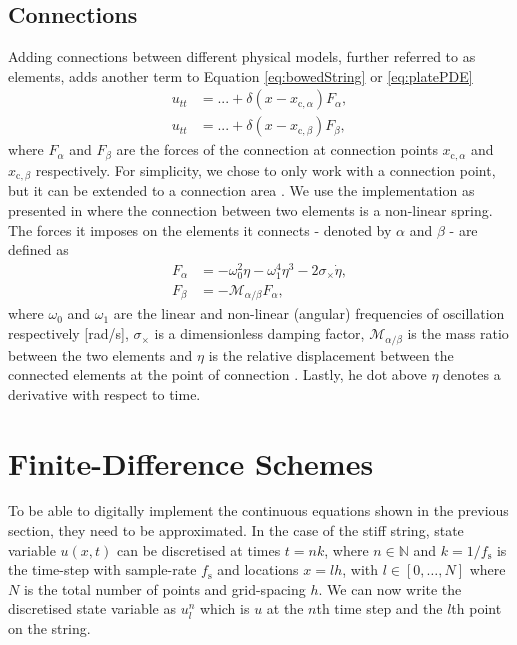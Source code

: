 \documentclass{article}
\begin{document}
\subsection{Connections}\label{sec:connections}
Adding connections between different physical models, further referred to as elements, adds another term to Equation \eqref{eq:bowedString} or \eqref{eq:platePDE}
\begin{equation}
\begin{aligned}
    u_{tt} &= ... + \delta(x-x_{\text{c},\alpha})F_\alpha, \\
    u_{tt} &= ... + \delta(x-x_{\text{c},\beta})F_\beta,
\end{aligned}
\end{equation}
where $F_\alpha$ and $F_\beta$ are the forces of the connection at connection points $x_{\text{c},\alpha}$ and $x_{\text{c},\beta}$ respectively. For simplicity, we chose to only work with a connection point, but it can be extended to a connection area \cite{Bilbao2009:ModularPercussion}. We use the implementation as presented in \cite{Bilbao2009:ModularPercussion} where the connection between two elements is a non-linear spring. The forces it imposes on the elements it connects - denoted by $\alpha$ and $\beta$ - are defined as
\begin{subequations}\label{eq:connectionsPDE}
\begin{align}
    F_\alpha &= -\omega_0^2\eta - \omega_1^4\eta^3 - 2\sigma_\times\dot\eta,\\
    F_\beta &= -\mathcal{M}_{\alpha/\beta}F_\alpha,
\end{align}
\end{subequations}
where $\omega_0$ and $\omega_1$ are the linear and non-linear (angular) frequencies of oscillation respectively [rad/s], $\sigma_\times$ is a dimensionless damping factor, $\mathcal{M}_{\alpha/\beta}$ is the mass ratio between the two elements and $\eta$ is the relative displacement between the connected elements at the point of connection%
. Lastly, he dot above $\eta$ denotes a derivative with respect to time.

\section{Finite-Difference Schemes}\label{sec:FDS}
To be able to digitally implement the continuous equations shown in the previous section, they need to be approximated. In the case of the stiff string, state variable $u(x,t)$ can be discretised at times $t = nk$, where $n \in \mathbb{N}$ and $k = 1 / f_\text{s}$ is the time-step with sample-rate $f_\text{s}$ and locations $x = lh$, with $l \in [0,\hdots, N]$ where $N$ is the total number of points and grid-spacing $h$. We can now write the discretised state variable as $u_l^n$ which is $u$ at the $n$th time step and the $l$th point on the string.
\end{document}
